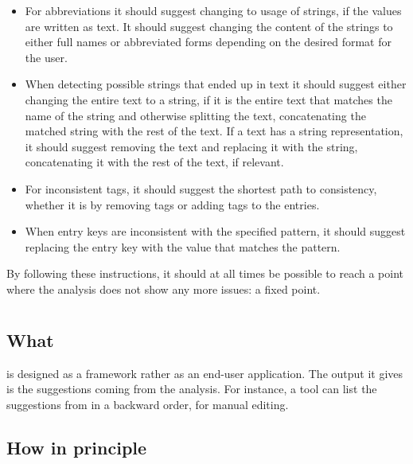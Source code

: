 \begin{itemize}
\item For abbreviations it should suggest changing to usage of
  strings, if the values are written as text.  It should suggest
  changing the content of the strings to either full names or
  abbreviated forms depending on the desired format for the user.

\item When detecting possible strings that ended up in text it should
  suggest either changing the entire text to a string, if it is the
  entire text that matches the name of the string and otherwise
  splitting the text, concatenating the matched string with the rest
  of the text.  If a text has a string representation, it should
  suggest removing the text and replacing it with the string,
  concatenating it with the rest of the text, if relevant.

\item For inconsistent tags, it should suggest the shortest path to
  consistency, whether it is by removing tags or adding tags to the
  entries.

\item When entry keys are inconsistent with the specified pattern, it
  should suggest replacing the entry key with the value that matches
  the pattern.
\end{itemize}

By following these instructions, it should at all times be possible to
reach a point where the analysis does not show any more issues: a
fixed point.


\section{\orangutan}

\subsection{What}
\label{sec:organizing_orangutan_what}

{\orangutan} is designed as a framework rather as an end-user
application.  The output it gives is the suggestions coming from the
analysis.  For instance, a tool can list the suggestions from
{\orangutan} in a backward order, for manual editing.


\subsection{How in principle}
\label{sec:organizing_orangutan_how_principle}

